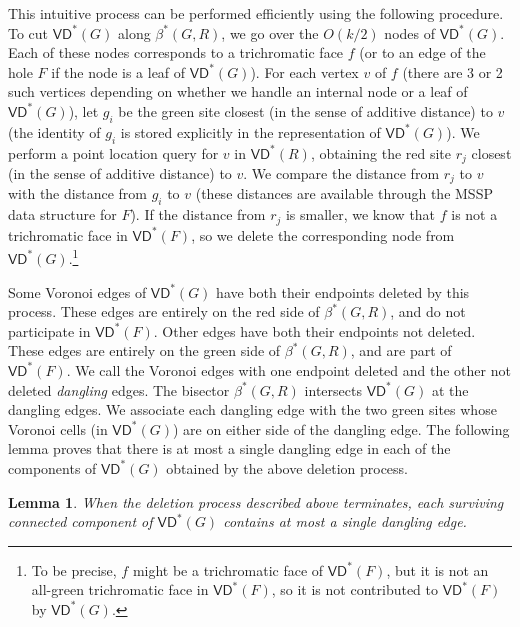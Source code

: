 \documentclass{article}
\newcommand{\VD}{\textsf{VD}}
\newtheorem{lemma}{Lemma}
\begin{document}
This intuitive process can be performed efficiently using the following procedure.
To cut $\VD^*(G)$ along $\beta^*(G,R)$, we go over the $O(k/2)$ nodes of $\VD^*(G)$. Each of these nodes corresponds to a trichromatic face $f$ (or to an edge of the hole $F$ if the node is a leaf of $\VD^*(G)$).
For each vertex $v$ of $f$ (there are 3 or 2 such vertices depending on whether we handle an internal node or a leaf of $\VD^*(G)$), let $g_i$ be the green site closest (in the sense of additive distance) to $v$ (the identity of $g_i$ is stored explicitly in the representation of $\VD^*(G)$).
We perform a point location query for $v$ in $\VD^*(R)$, obtaining the red site $r_j$ closest (in the sense of additive distance) to $v$.
We compare the distance from $r_j$ to $v$ with the distance from $g_i$ to $v$ (these distances are available through the MSSP data structure for $F$). If the distance from $r_j$ is smaller, we know that $f$ is not a trichromatic face in $\VD^*(F)$, so we delete the corresponding node from $\VD^*(G)$.\footnote{To be precise, $f$ might be a trichromatic face of $\VD^*(F)$, but it is not an all-green trichromatic face in $\VD^*(F)$, so it is not contributed to $\VD^*(F)$ by $\VD^*(G)$.}

Some Voronoi edges of $\VD^*(G)$ have both their endpoints deleted by this process. These edges are entirely on the red side of $\beta^*(G,R)$, and do not participate in $\VD^*(F)$. Other edges have both their endpoints not deleted. These edges are entirely on the green side of $\beta^*(G,R)$, and are part of $\VD^*(F)$.
We call the Voronoi edges with one endpoint deleted and the other not deleted {\em dangling} edges.  The bisector $\beta^*(G,R)$ intersects $\VD^*(G)$ at the dangling edges.
We associate each dangling edge with the two green sites whose Voronoi cells (in $\VD^*(G)$) are on either side of the dangling edge.
The following lemma proves that there is at most a single dangling edge in each of the components of $\VD^*(G)$ obtained by the above deletion process.

\begin{lemma}\label{lem:merge_bisector_dangling_edge_components}
When the deletion process described above terminates, each surviving connected component of $\VD^*(G)$ contains at most a single dangling edge.

\end{lemma}
\end{document}

